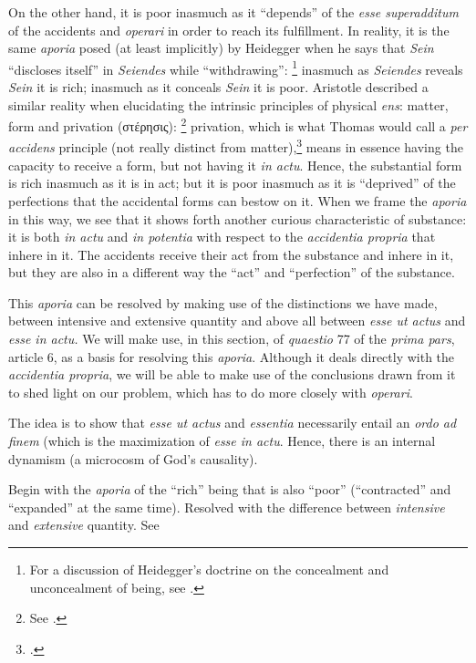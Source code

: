 %
On the other hand, it is poor inasmuch as it “depends” of the \emph{esse superadditum} of the accidents and \emph{operari} in order to reach its fulfillment. In reality, it is the same \emph{aporia} posed (at least implicitly) by Heidegger when he says that \emph{Sein} “discloses itself” in \emph{Seiendes} while “withdrawing”:%
%
\footnote{For a discussion of Heidegger’s doctrine on the concealment and unconcealment of being, see \cite[200–203]{contat:confronto}.}
%
inasmuch as \emph{Seiendes} reveals \emph{Sein} it is rich; inasmuch as it conceals \emph{Sein} it is poor.
Aristotle described a similar reality when elucidating the intrinsic principles of physical \emph{ens}: matter, form and privation (στέρησις):%
%
\footnote{See \cite[160–163]{definance:etre-et-agir}.}
%
privation, which is what Thomas would call a \emph{per accidens} principle (not really distinct from matter),\footcite[9]{st:deprincipiis} means in essence having the capacity to receive a form, but not having it \emph{in actu}. Hence, the substantial form is rich inasmuch as it is in act; but it is poor inasmuch as it is “deprived” of the perfections that the accidental forms can bestow on it.
%
When we frame the \emph{aporia} in this way, we see that it shows forth another curious characteristic of substance: it is both \emph{in actu} and \emph{in potentia} with respect to the \emph{accidentia propria} that inhere in it. The accidents receive their act from the substance and inhere in it, but they are also in a different way the “act” and “perfection” of the substance.

This \emph{aporia} can be resolved by making use of the distinctions we have made, between intensive and extensive quantity and above all between \emph{esse ut actus} and \emph{esse in actu.} We will make use, in this section, of \emph{quaestio} 77 of the \emph{prima pars}, article 6, as a basis for resolving this \emph{aporia}. Although it deals directly with the \emph{accidentia propria}, we will be able to make use of the conclusions drawn from it to shed light on our problem, which has to do more closely with \emph{operari}.

\begin{DONE}

The idea is to show that \emph{esse ut actus} and \emph{essentia} necessarily entail an \emph{ordo ad finem} (which is the maximization of \emph{esse in actu}. Hence, there is an internal dynamism (a microcosm of God’s causality).

  \item Begin with the \emph{aporia} of the “rich” being that is also “poor” (“contracted” and “expanded” at the same time). Resolved with the difference between \emph{intensive} and \emph{extensive} quantity. See 

\end{DONE}

